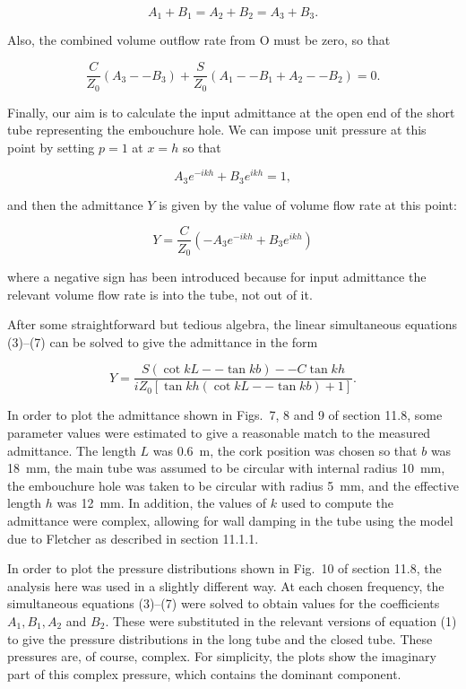   $$A_1+B_1 = A_2 + B_2 = A_3 + B_3 . \tag{5}$$ 

  Also, the combined volume outflow rate from O must be zero, so that 

  $$\dfrac{C}{Z_0}(A_3 -- B_3) + \dfrac{S}{Z_0}(A_1 -- B_1 + A_2 -- B_2) = 0 . 
  \tag{6}$$ 

  Finally, our aim is to calculate the input admittance at the open end of the 
  short tube representing the embouchure hole. We can impose unit pressure at 
  this point by setting $p=1$ at $x=h$ so that 

  $$A_3 e^{-ikh} + B_3 e^{ikh} =1, \tag{7}$$ 

  and then the admittance $Y$ is given by the value of volume flow rate at this 
  point: 

  $$Y=\dfrac{C}{Z_0}\left( -A_3 e^{-ikh} + B_3 e^{ikh} \right) \tag{8}$$ 

  where a negative sign has been introduced because for input admittance the 
  relevant volume flow rate is into the tube, not out of it. 

  After some straightforward but tedious algebra, the linear simultaneous 
  equations (3)--(7) can be solved to give the admittance in the form 

  $$Y = \dfrac{S (\cot kL -- \tan kb ) -- C \tan kh}{i Z_0 \left[ \tan kh (\cot 
  kL -- \tan kb ) +1 \right]} . \tag{9}$$ 

  In order to plot the admittance shown in Figs.\ 7, 8 and 9 of section 11.8, 
  some parameter values were estimated to give a reasonable match to the 
  measured admittance. The length $L$ was 0.6 m, the cork position was chosen 
  so that $b$ was 18 mm, the main tube was assumed to be circular with internal 
  radius 10 mm, the embouchure hole was taken to be circular with radius 5 mm, 
  and the effective length $h$ was 12 mm. In addition, the values of $k$ used 
  to compute the admittance were complex, allowing for wall damping in the tube 
  using the model due to Fletcher as described in section 11.1.1. 

  In order to plot the pressure distributions shown in Fig.\ 10 of section 
  11.8, the analysis here was used in a slightly different way. At each chosen 
  frequency, the simultaneous equations (3)--(7) were solved to obtain values 
  for the coefficients $A_1, B_1, A_2$ and $B_2$. These were substituted in the 
  relevant versions of equation (1) to give the pressure distributions in the 
  long tube and the closed tube. These pressures are, of course, complex. For 
  simplicity, the plots show the imaginary part of this complex pressure, which 
  contains the dominant component. 